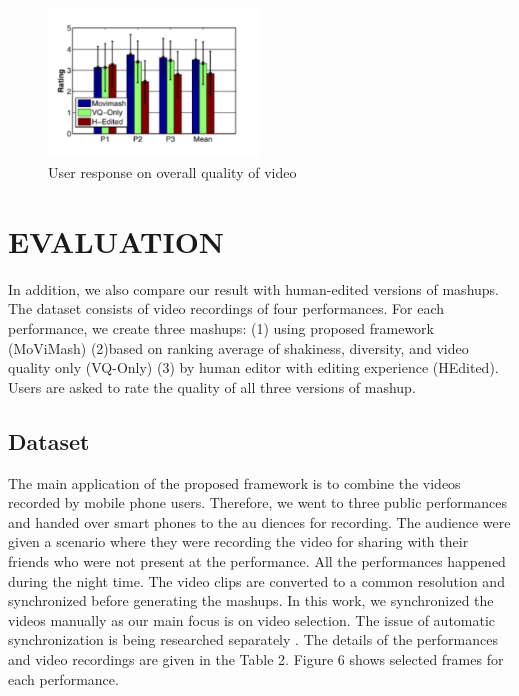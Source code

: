 \documentclass{sig-alternate}
\begin{document}
\begin{figure}[h]
    \centering
    \includegraphics[width=0.5\textwidth]{img8.png}
    \caption{User response on overall quality of video}
    \label{fig:mesh8}
\end{figure}
    
    \section{EVALUATION}
   In addition, we also compare our result with human-edited versions of mashups. The dataset consists of video recordings of four performances. For each performance, we create three mashups: (1) using proposed framework (MoViMash) (2)based on ranking average of shakiness, diversity, and video quality
    only (VQ-Only) (3) by human editor with editing experience (HEdited). Users are asked to rate the quality of all three versions of mashup.
    \subsection{Dataset}
    The main application of the proposed framework is to combine the videos recorded by mobile phone users. Therefore, we went to three public performances and handed over smart phones to the au diences for recording. The audience were given a scenario where they were recording the video for sharing with their friends who were not present at the performance. All the performances happened during the night time. The video clips are converted to a common resolution and synchronized before generating the mashups. In this work, we synchronized the videos manually as our main focus is on video selection. The issue of automatic synchronization is being researched separately \cite{14}. The details of the performances and video recordings are given in the Table 2. Figure 6 shows selected frames for each performance.
\end{document}
